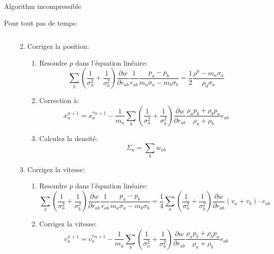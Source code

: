 \begin{frame}[shrink]{Algorithm incompressible}
\begin{block}{Pour tout pas de temps:}
\begin{enumerate}
\begin{enumerate}
\begin{equation*}
			\end{equation*}
			\item Corrigez la position:
			\begin{enumerate}[<*>]
				\item Resoudre $p$ dans l'équation linéaire:
				\begin{equation*}
				\sum_{b}\left(\frac{1}{\sigma_{a}^2}+\frac{1}{\sigma_{b}^2}\right)\frac{\partial w}{\partial r_{ab}}\frac{1}{r_{ab}}\frac{p_a-p_b}{m_a\sigma_{a}-m_{b}\sigma_{b}} =\frac{1}{2}\frac{\rho^{0}-m_{a}\sigma_{a}}{\rho_{0}\sigma_{a}}
				\end{equation*}
				\item Correction à:
				\begin{equation*}
				x^{n+1}_{a}=x^{*n+1}_{a}-\frac{1}{m_a}\sum_{b}\left(\frac{1}{\sigma_{a}^2}+\frac{1}{\sigma_{b}^2}\right)\frac{\partial w}{\partial r_{ab}}\frac{\rho_{a}p_{b}+\rho_{b}p_{a}}{\rho_a+\rho_b}e_{ab}
				\end{equation*}
				\item Calculez la densité:
				\begin{equation*}
				\Sigma_{a}=\sum_{b}w_{ab}
				\end{equation*}
			\end{enumerate}
			\item Corrigez la vitesse:
			\begin{enumerate}[<*>]
				\item Resoudre $p$ dans l'équation linéaire:
				\begin{equation*}
				\sum_{b}\left(\frac{1}{\sigma_{a}^2}+\frac{1}{\sigma_{b}^2}\right)\frac{\partial w}{\partial r_{ab}}\frac{1}{r_{ab}}\frac{p_a-p_b}{m_a\sigma_{a}-m_{b}\sigma_{b}} =\frac{1}{4}\sum_{b}\left(\frac{1}{\sigma_{a}^2}+\frac{1}{\sigma_{b}^2}\right)\frac{\partial w}{\partial r_{ab}}\left(v_{a}+v_b\right)\cdot e_{ab}
				\end{equation*}
				\item Corrigez la vitesse:
				\begin{equation*}
				v^{n+1}_{a}=v^{*n+1}_{a}-\frac{1}{m_a}\sum_{b}\left(\frac{1}{\sigma_{a}^2}+\frac{1}{\sigma_{b}^2}\right)\frac{\partial w}{\partial r_{ab}}\frac{\rho_{a}p_{b}+\rho_{b}p_{a}}{\rho_a+\rho_b}e_{ab}
				\end{equation*}
			\end{enumerate}
		\end{enumerate}
	\end{enumerate}
\end{block}
 \end{frame}


